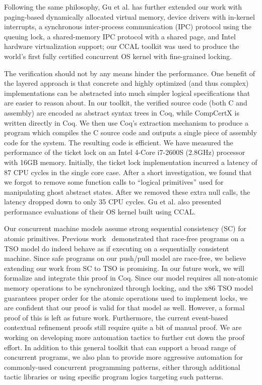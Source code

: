 Following the same philosophy, 
Gu et al. \cite{certikos-osdi16} has further extended our work with paging-based
dynamically allocated virtual
memory, device drivers with in-kernel interrupts, a synchronous inter-process
communication (IPC) protocol using the queuing lock, a shared-memory IPC protocol with
a shared page, and Intel hardware virtualization support;
our CCAL toolkit was used to produce the world's
first fully certified concurrent OS kernel
with fine-grained locking. 


The verification should not by any means hinder the performance.
One benefit of the layered approach is that
concrete and highly optimized (and thus complex) implementations can be abstracted
into much simpler logical specifications that are easier to reason about.
In our toolkit, the verified source code (both C and assembly) are encoded as
abstract syntax trees in Coq, while CompCertX is written directly in
Coq. We then use Coq's extraction mechanism to produce a program which
compiles the C source code and outputs a single piece of assembly code
for the system. The resulting code is efficient.
We have measured the performance
of the ticket lock on an Intel 4-Core i7-2600S (2.8GHz) processor with 16GB memory.
Initially, the ticket lock implementation incurred a latency of 87 CPU cycles in the
single core case.
After a short investigation, we found that we forgot to remove some function calls
to ``logical primitives'' used for manipulating ghost abstract states. After we removed
these extra null calls, the latency dropped down to only 35 CPU cycles.
Gu et al. \cite{certikos-osdi16} also presented performance
evaluations of their OS kernel built using CCAL.


Our concurrent  machine models assume strong sequential consistency (SC)
for atomic primitives. 
Previous work~\cite{SewellSONM10} demonstrated that race-free programs on a
TSO model do indeed behave as if executing on a
sequentially consistent machine. Since safe programs on our push/pull model are race-free, 
we believe extending our work from SC to TSO is promising. In our future work,
we will formalize and integrate this proof in Coq.
Since our model requires all non-atomic memory
operations to be synchronized through locking, and the x86 TSO model
guarantees proper order for the atomic operations used to implement
locks, we are confident that our proof is valid for that model as
well.  However, a formal proof of this is left as future work.
Furthermore, the current event-based contextual refinement proofs still require
quite a bit of manual proof. We are working on developing more
automation tactics to further cut down the proof effort. In addition to this
general toolkit that can support a broad range of concurrent programs,
we also plan to provide more aggressive automation for commonly-used
concurrent programming patterns, either through additional tactic
libraries or using specific program logics targeting such patterns.

